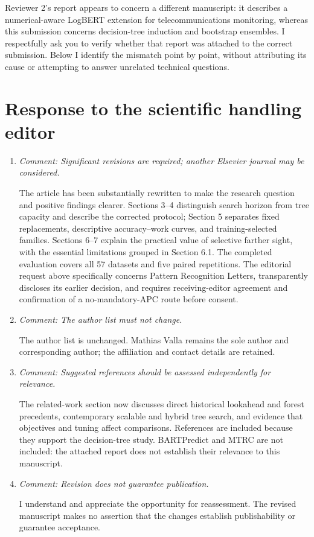 \documentclass[11pt]{article}
\newcommand{\comment}[1]{\textit{Comment: #1}}
\begin{document}
Reviewer 2's report appears to concern a different manuscript: it describes a numerical-aware LogBERT extension for telecommunications monitoring, whereas this submission concerns decision-tree induction and bootstrap ensembles. I respectfully ask you to verify whether that report was attached to the correct submission. Below I identify the mismatch point by point, without attributing its cause or attempting to answer unrelated technical questions.

\section*{Response to the scientific handling editor}
\begin{enumerate}[label=E\arabic*.]
\item \comment{Significant revisions are required; another Elsevier journal may be considered.}

The article has been substantially rewritten to make the research question and positive findings clearer. Sections 3--4 distinguish search horizon from tree capacity and describe the corrected protocol; Section 5 separates fixed replacements, descriptive accuracy--work curves, and training-selected families. Sections 6--7 explain the practical value of selective farther sight, with the essential limitations grouped in Section 6.1. The completed evaluation covers all 57 datasets and five paired repetitions. The editorial request above specifically concerns Pattern Recognition Letters, transparently discloses its earlier decision, and requires receiving-editor agreement and confirmation of a no-mandatory-APC route before consent.

\item \comment{The author list must not change.}

The author list is unchanged. Mathias Valla remains the sole author and corresponding author; the affiliation and contact details are retained.

\item \comment{Suggested references should be assessed independently for relevance.}

The related-work section now discusses direct historical lookahead and forest precedents, contemporary scalable and hybrid tree search, and evidence that objectives and tuning affect comparisons. References are included because they support the decision-tree study. BARTPredict and MTRC are not included: the attached report does not establish their relevance to this manuscript.

\item \comment{Revision does not guarantee publication.}

I understand and appreciate the opportunity for reassessment. The revised manuscript makes no assertion that the changes establish publishability or guarantee acceptance.
\end{enumerate}
\end{document}
